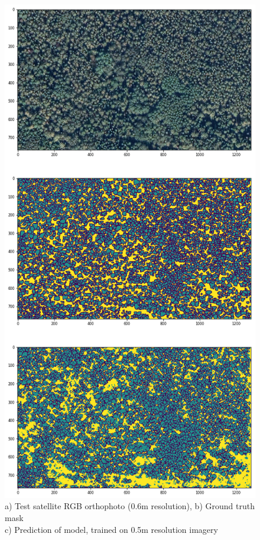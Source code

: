 \begin{figure}[ht]
\centering
\includegraphics[scale=0.6]{images/TEST05SAT.png}
\caption{a) Test satellite RGB orthophoto (0.6m resolution), b) Ground truth mask \\c) Prediction of model, trained on 0.5m  resolution imagery}
\label{TEST03}
\end{figure}

\clearpage
\newpage
